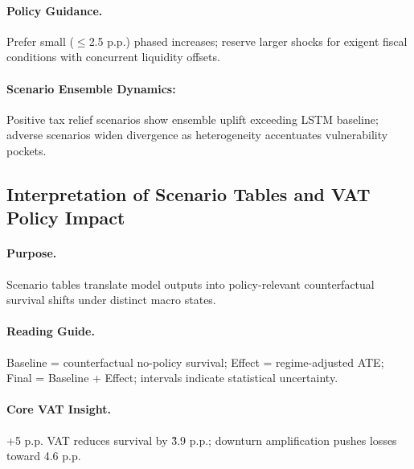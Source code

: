 \paragraph{Policy Guidance.} Prefer small ($\leq$2.5 p.p.) phased increases; reserve larger shocks for exigent fiscal conditions with concurrent liquidity offsets.

\paragraph{Scenario Ensemble Dynamics:} Positive tax relief scenarios show ensemble uplift exceeding LSTM baseline; adverse scenarios widen divergence as heterogeneity accentuates vulnerability pockets.

\subsection{Interpretation of Scenario Tables and VAT Policy Impact}
\paragraph{Purpose.} Scenario tables translate model outputs into policy-relevant counterfactual survival shifts under distinct macro states.

\paragraph{Reading Guide.} Baseline = counterfactual no-policy survival; Effect = regime-adjusted ATE; Final = Baseline + Effect; intervals indicate statistical uncertainty.

\paragraph{Core VAT Insight.} +5 p.p. VAT reduces survival by \~3.9 p.p.; downturn amplification pushes losses toward 4.6 p.p.

